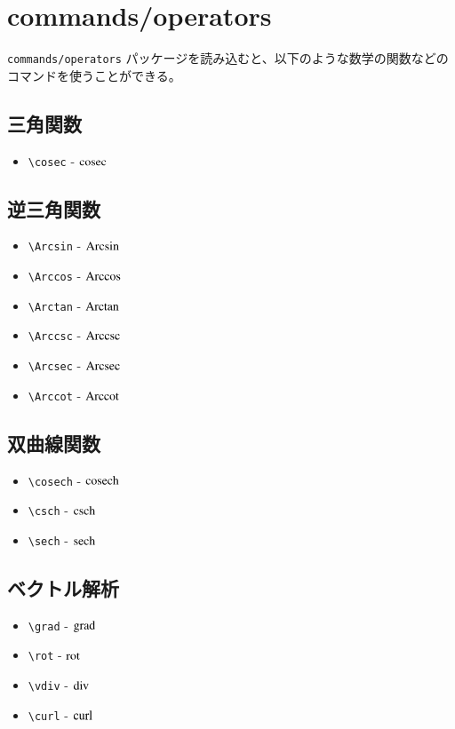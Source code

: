 \documentclass[oneside,10pt,a4paper]{jsarticle}
\begin{document}
  \newpage

  \section{commands/operators}

  \verb|commands/operators| パッケージを読み込むと、以下のような数学の関数などのコマンドを使うことができる。

  \subsection{三角関数}

  \begin{itemize}
    \item \verb|\cosec| - $ \operatorname{cosec} $
  \end{itemize}

  \subsection{逆三角関数}

  \begin{itemize}
    \item \verb|\Arcsin| - $ \operatorname{Arcsin} $
    \item \verb|\Arccos| - $ \operatorname{Arccos} $
    \item \verb|\Arctan| - $ \operatorname{Arctan} $
    \item \verb|\Arccsc| - $ \operatorname{Arccsc} $
    \item \verb|\Arcsec| - $ \operatorname{Arcsec} $
    \item \verb|\Arccot| - $ \operatorname{Arccot} $
  \end{itemize}

  \subsection{双曲線関数}

  \begin{itemize}
    \item \verb|\cosech| - $ \operatorname{cosech} $
    \item \verb|\csch| - $ \operatorname{csch} $
    \item \verb|\sech| - $ \operatorname{sech} $
  \end{itemize}

  \subsection{ベクトル解析}

  \begin{itemize}
    \item \verb|\grad| - $ \operatorname{grad} $
    \item \verb|\rot| - $ \operatorname{rot} $
    \item \verb|\vdiv| - $ \operatorname{div} $
    \item \verb|\curl| - $ \operatorname{curl} $
  \end{itemize}
\end{document}
